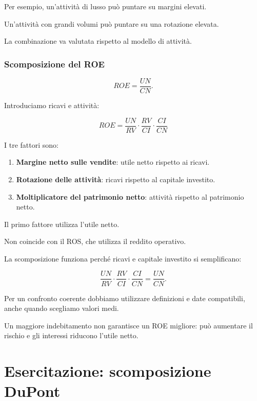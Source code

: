 \noindent Per esempio,
un'attività di lusso
può puntare su margini elevati.

\noindent Un'attività con grandi volumi
può puntare su una rotazione elevata.

\noindent La combinazione va valutata
rispetto al modello di attività.


\subsubsection*{Scomposizione del ROE}

\[
ROE=\frac{UN}{CN}.
\]

\noindent Introduciamo ricavi e attività:

\[
\boxed{
ROE
=
\frac{UN}{RV}
\cdot
\frac{RV}{CI}
\cdot
\frac{CI}{CN}
}
\]

\noindent I tre fattori sono:

\begin{enumerate}
    \item \textbf{Margine netto sulle vendite}:
    utile netto rispetto ai ricavi.

    \item \textbf{Rotazione delle attività}:
    ricavi rispetto al capitale investito.

    \item \textbf{Moltiplicatore del patrimonio netto}:
    attività rispetto al patrimonio netto.
\end{enumerate}

\noindent Il primo fattore
utilizza l'utile netto.

\noindent Non coincide con il ROS,
che utilizza il reddito operativo.

\medskip

\noindent La scomposizione funziona
perché ricavi e capitale investito
si semplificano:

\[
\frac{UN}{RV}
\cdot
\frac{RV}{CI}
\cdot
\frac{CI}{CN}
=
\frac{UN}{CN}.
\]

\noindent Per un confronto coerente
dobbiamo utilizzare definizioni
e date compatibili,
anche quando scegliamo valori medi.

\medskip

\noindent Un maggiore indebitamento
non garantisce un ROE migliore:
può aumentare il rischio
e gli interessi riducono l'utile netto.


\section{Esercitazione: scomposizione DuPont}

